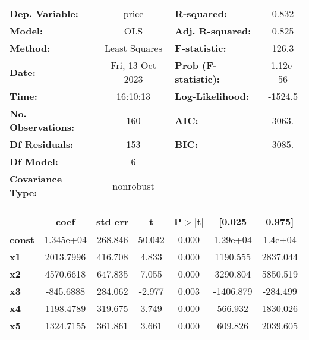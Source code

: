 \begin{center}
\begin{tabular}{lclc}
\toprule
\textbf{Dep. Variable:}    &      price       & \textbf{  R-squared:         } &     0.832   \\
\textbf{Model:}            &       OLS        & \textbf{  Adj. R-squared:    } &     0.825   \\
\textbf{Method:}           &  Least Squares   & \textbf{  F-statistic:       } &     126.3   \\
\textbf{Date:}             & Fri, 13 Oct 2023 & \textbf{  Prob (F-statistic):} &  1.12e-56   \\
\textbf{Time:}             &     16:10:13     & \textbf{  Log-Likelihood:    } &   -1524.5   \\
\textbf{No. Observations:} &         160      & \textbf{  AIC:               } &     3063.   \\
\textbf{Df Residuals:}     &         153      & \textbf{  BIC:               } &     3085.   \\
\textbf{Df Model:}         &           6      & \textbf{                     } &             \\
\textbf{Covariance Type:}  &    nonrobust     & \textbf{                     } &             \\
\bottomrule
\end{tabular}
\begin{tabular}{lcccccc}
               & \textbf{coef} & \textbf{std err} & \textbf{t} & \textbf{P$> |$t$|$} & \textbf{[0.025} & \textbf{0.975]}  \\
\midrule
\textbf{const} &    1.345e+04  &      268.846     &    50.042  &         0.000        &     1.29e+04    &      1.4e+04     \\
\textbf{x1}    &    2013.7996  &      416.708     &     4.833  &         0.000        &     1190.555    &     2837.044     \\
\textbf{x2}    &    4570.6618  &      647.835     &     7.055  &         0.000        &     3290.804    &     5850.519     \\
\textbf{x3}    &    -845.6888  &      284.062     &    -2.977  &         0.003        &    -1406.879    &     -284.499     \\
\textbf{x4}    &    1198.4789  &      319.675     &     3.749  &         0.000        &      566.932    &     1830.026     \\
\textbf{x5}    &    1324.7155  &      361.861     &     3.661  &         0.000        &      609.826    &     2039.605     \\

\end{tabular}
\end{center}
